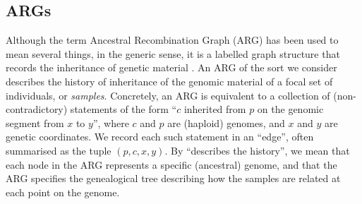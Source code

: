 \documentclass{article}
\begin{document}
\subsection*{ARGs} \label{par:recording}
Although the term Ancestral Recombination Graph (ARG) has been used to mean several things,
in the generic sense, it is a labelled graph structure that records
the inheritance of genetic material \citep{wong_general_2023}.
An ARG of the sort we consider describes the history of inheritance
of the genomic material of a focal set of individuals, or \emph{samples}.
Concretely, an ARG is equivalent to a collection of (non-contradictory) statements
of the form ``$c$ inherited from $p$ on the genomic segment from $x$ to $y$'',
where $c$ and $p$ are (haploid) genomes, and $x$ and $y$ are genetic coordinates.
We record each such statement in an ``edge'',
often summarised as the tuple $(p,c,x,y)$.
By ``describes the history'',
we mean that each node in the ARG represents a specific (ancestral) genome, 
and that the ARG specifies the genealogical tree describing how the samples are related
at each point on the genome. 
\end{document}
